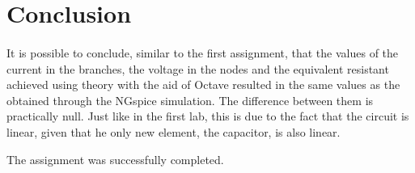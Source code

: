 \section{Conclusion}
\label{sec:conclusion}
\paragraph{}
\par It is possible to conclude, similar to the first assignment, that the values of the current in the branches, the voltage in the nodes and the equivalent resistant achieved using theory with the aid of Octave resulted in the same values as the obtained through the NGspice simulation. The difference between them is practically null. Just like in the first lab, this is due to the fact that the circuit is linear, given that he only new element, the capacitor, is also linear. 
\par The assignment was successfully completed.      
